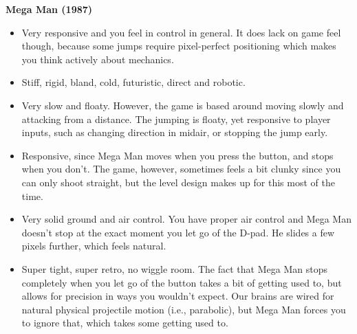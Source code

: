 \textbf{Mega Man (1987)}
\vspace{-5mm}
\begin{itemize}[noitemsep,nolistsep]
\item Very responsive and you feel in control in general. It does lack on game feel though, because some jumps require pixel-perfect positioning which makes you think actively about mechanics.
\item Stiff, rigid, bland, cold, futuristic, direct and robotic.
\item Very slow and floaty. However, the game is based around moving slowly and attacking from a distance. The jumping is floaty, yet responsive to player inputs, such as changing direction in midair, or stopping the jump early. 
\item Responsive, since Mega Man moves when you press the button, and stops when you don't. The game, however, sometimes feels a bit clunky since you can only shoot straight, but the level design makes up for this most of the time.
\item Very solid ground and air control. You have proper air control and Mega Man doesn't stop at the exact moment you let go of the D-pad. He slides a few pixels further, which feels natural.
\item Super tight, super retro, no wiggle room. The fact that Mega Man stops completely when you let go of the button takes a bit of getting used to, but allows for precision in ways you wouldn't expect. Our brains are wired for natural physical projectile motion (i.e., parabolic), but Mega Man forces you to ignore that, which takes some getting used to.
\end{itemize}


